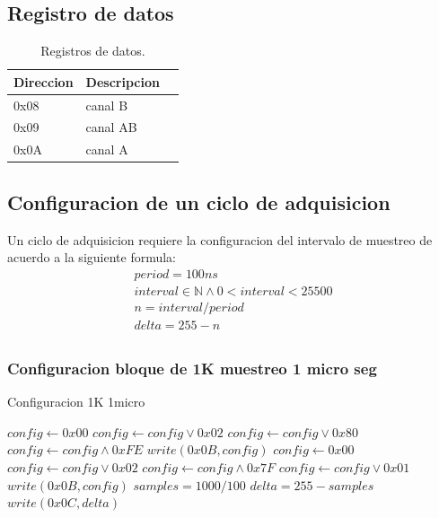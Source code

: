 \subsection{Registro de datos}

\begin{table}[ht]
    \centering
    \begin{tabular}{|l|l|l|}
    \hline
    Direccion & Descripcion \\
    \hline
     0x08 & canal B\\ 
    \hline
     0x09 & canal AB\\
     \hline
     0x0A & canal A\\
     \hline
\end{tabular}
\caption{\label{tab:registros_ad_datos}Registros de datos.}
\end{table}


\subsection{Configuracion de un ciclo de adquisicion}

Un ciclo de adquisicion requiere la configuracion del intervalo de muestreo
de acuerdo a la siguiente formula:
\begin{gather}
period = 100 ns\\
interval \in \mathbb{N} \land 0 < interval < 25500\\
n = interval / period\\
delta  = 255 - n\\
\end{gather}

\subsubsection{Configuracion bloque de 1K muestreo 1 micro seg}

\begin{algorithm}
    \caption{Configuracion 1K 1micro}\label{algo_ad_conf}
    \begin{algorithmic}[1]
    \State
    \State $config \gets 0x00$
    \State $config \gets config \lor 0x02$
    \State $config \gets config \lor 0x80$
    \State $config \gets config \land 0xFE$
    \State $write(0x0B, config)$
    \State
    \State $config \gets 0x00$
    \State $config \gets config \lor 0x02$
    \State $config \gets config \land 0x7F$
    \State $config \gets config \lor 0x01$
    \State $write(0x0B, config)$
    \State
    \State $samples= 1000 / 100$
    \State $delta = 255 - samples$
    \State $write(0x0C, delta)$

    \EndProcedure
    \end{algorithmic}
    \end{algorithm}
    \newpage
